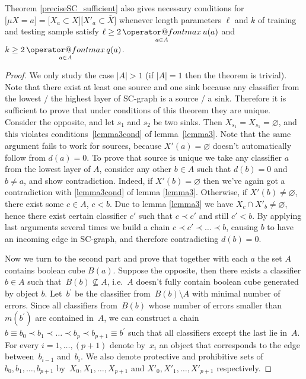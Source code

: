 \documentclass{article}
\makeatletter
\newcommand{\X}{\bar X}
\renewcommand{\emptyset}{\varnothing}\newcommand{\emset}{\varnothing}
\renewcommand{\max}{\mathop{\operator@font max}\limits}
\makeatother
\begin{document}
\begin{theorem}
\label{preciseSC_necessary}
Theorem \ref{preciseSC_sufficient} also gives necessary conditions for $\bigl[\mu X = a\bigr] = \bigl[X_{a} \subset X\bigr]\bigl[X'_{a} \subset \X\bigr]$
whenever length parameters $\ell$ and $k$ of training and testing sample satisfy $\ell \ge 2\max\limits_{a \in A}u(a)$ and $k \ge 2\max\limits_{a \in A}q(a)$.
\end{theorem}

\begin{proof}
We only study the case $|A| > 1$ (if $|A| = 1$ then the theorem is trivial).
Note that there exist at least one source and one sink because any classifier from the lowest / the highest layer of SC-graph is a source / a sink.
Therefore it is sufficient to prove that under conditions of this theorem they are unique. 
Consider the opposite, and let $s_1$ and $s_2$ be two sinks. 
Then $X_{s_1} = X_{s_1} = \emptyset$, and this violates conditions~\eqref{lemma3cond} of lemma~\ref{lemma3}.
Note that the same argument fails to work for sources, because $X'(a) = \emptyset$ doesn't automatically follow from $d(a) = 0$.
To prove that source is unique we take any classifier $a$ from the lowest layer of $A$, 
consider any other $b \in A$ such that $d(b) = 0$ and $b \neq a$, and show contradiction.
Indeed, if $X'(b) = \emptyset$ then we've again got a contradiction with \eqref{lemma3cond} of lemma \ref{lemma3}.
Otherwise, if $X'(b) \neq \emptyset$, there exist some $c \in A$, $c < b$.
Due to lemma \ref{lemma3} we have $X_c \cap X'_b \neq \emptyset$,
hence there exist certain classifier $c'$ such that $c \prec c'$ and still $c' < b$.
By applying last arguments several times we build a chain $c \prec c' \prec \dots \prec b$,
causing $b$ to have an incoming edge in SC-graph, and therefore contradicting $d(b) = 0$.

Now we turn to the second part and prove that together with each $a$ the set $A$ contains boolean cube $B(a)$.
Suppose the opposite, then there exists a classifier $b \in A$ such that~$B(b) \nsubseteq A$,
i.e.~$A$ doesn't fully contain boolean cube generated by object $b$.
Let~$b^\prime$ be the classifier from~$B(b) \setminus A$ with minimal number of errors.
Since all classifiers from~$B(b)$ whose number of errors smaller than~$m(b^\prime)$
are contained in~$A$, we can construct a chain
$b \equiv b_0 \prec b_1 \prec \ldots \prec b_{p} \prec b_{p + 1} \equiv b^\prime$
such that all classifiers except the last lie in~$A$.
For every $i = 1, \dots, (p+1)$ denote by~$x_i$ an object that corresponds to the edge between~$b_{i - 1}$ and~$b_i$.
We also denote protective and prohibitive sets of~$b_0, b_1, \ldots, b_{p + 1}$
by~$X_0, X_1, \ldots, X_{p + 1}$ and $X'_0, X'_1, \ldots, X'_{p + 1}$ respectively.


\end{proof}
\end{document}
